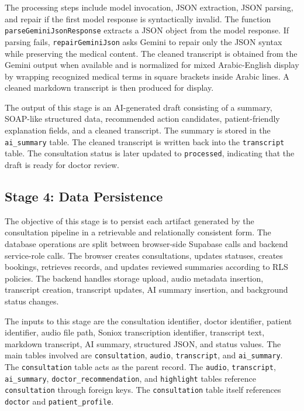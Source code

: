 The processing steps include model invocation, JSON extraction, JSON parsing, and repair if the first model response is syntactically invalid. The function \texttt{parseGeminiJsonResponse} extracts a JSON object from the model response. If parsing fails, \texttt{repairGeminiJson} asks Gemini to repair only the JSON syntax while preserving the medical content. The cleaned transcript is obtained from the Gemini output when available and is normalized for mixed Arabic-English display by wrapping recognized medical terms in square brackets inside Arabic lines. A cleaned markdown transcript is then produced for display.

The output of this stage is an AI-generated draft consisting of a summary, SOAP-like structured data, recommended action candidates, patient-friendly explanation fields, and a cleaned transcript. The summary is stored in the \texttt{ai\_summary} table. The cleaned transcript is written back into the \texttt{transcript} table. The consultation status is later updated to \texttt{processed}, indicating that the draft is ready for doctor review.

\subsection{Stage 4: Data Persistence}
\label{subsec:stage-persistence}

The objective of this stage is to persist each artifact generated by the consultation pipeline in a retrievable and relationally consistent form. The database operations are split between browser-side Supabase calls and backend service-role calls. The browser creates consultations, updates statuses, creates bookings, retrieves records, and updates reviewed summaries according to RLS policies. The backend handles storage upload, audio metadata insertion, transcript creation, transcript updates, AI summary insertion, and background status changes.

The inputs to this stage are the consultation identifier, doctor identifier, patient identifier, audio file path, Soniox transcription identifier, transcript text, markdown transcript, AI summary, structured JSON, and status values. The main tables involved are \texttt{consultation}, \texttt{audio}, \texttt{transcript}, and \texttt{ai\_summary}. The \texttt{consultation} table acts as the parent record. The \texttt{audio}, \texttt{transcript}, \texttt{ai\_summary}, \texttt{doctor\_recommendation}, and \texttt{highlight} tables reference \texttt{consultation} through foreign keys. The \texttt{consultation} table itself references \texttt{doctor} and \texttt{patient\_profile}.

